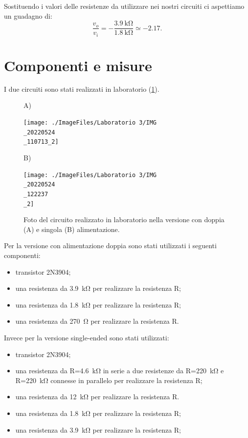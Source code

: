 Sostituendo i valori delle resistenze da utilizzare nei nostri circuiti ci aspettiamo un guadagno di:
\begin{equation}
	\frac{v_o}{v_i}=-\frac{\SI{3.9}{\kilo\ohm}}{\SI{1.8}{\kilo\ohm}}\simeq -2.17.
\end{equation}

\section{Componenti e misure}
I due circuiti sono stati realizzati in laboratorio (\Fig\ref{fig:commonemitter_circuito}).
\begin{figure}[h!]
	\centering
	A)
	
	\texttt{[image: ./ImageFiles/Laboratorio 3/IMG\\\_20220524\\\_110713\_2]}
	
	B)
	
	\texttt{[image: ./ImageFiles/Laboratorio 3/IMG\\\_20220524\\\_122237\\\_2]}
	\caption{Foto del circuito realizzato in laboratorio nella versione con doppia (A) e singola (B) alimentazione.}
	\label{fig:commonemitter_circuito}
\end{figure}
Per la versione con alimentazione doppia sono stati utilizzati i seguenti componenti:
\begin{itemize}
	\item transistor 2N3904;
	\item una resistenza da \SI{3.9}{\kilo\ohm} per realizzare la resistenza R;
	\item una resistenza da \SI{1.8}{\kilo\ohm} per realizzare la resistenza R;
	\item una resistenza da \SI{270}{\ohm} per realizzare la resistenza R.
\end{itemize}
Invece per la versione single-ended sono stati utilizzati:
\begin{itemize}
	\item transistor 2N3904;
	\item una resistenza da R=\SI{4.6}{\kilo\ohm} in serie a due resistenze da R=\SI{220}{\kilo\ohm} e R=\SI{220}{\kilo\ohm} connesse in parallelo per realizzare la resistenza R;
	\item una resistenza da \SI{12}{\kilo\ohm} per realizzare la resistenza R.
	\item una resistenza da \SI{1.8}{\kilo\ohm} per realizzare la resistenza R;
	\item una resistenza da \SI{3.9}{\kilo\ohm} per realizzare la resistenza R;
\end{itemize}

